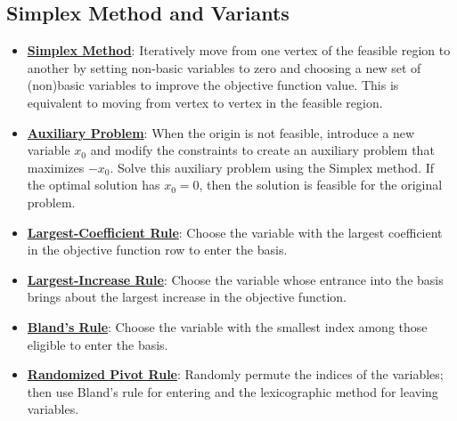 \documentclass{article}%
\begin{document}
\subsection{Simplex Method and Variants}%
\label{subsec:SimplexMethodandVariants}%
\begin{itemize}[leftmargin=*]%
\item \href{https://www.math.purdue.edu/~yipn/421/2024-08-27-ExSimplex.pdf#page=6}{\textbf{Simplex Method}}: Iteratively move from one vertex of the feasible region to another by setting non-basic variables to zero and choosing a new set of (non)basic variables to improve the objective function value. This is equivalent to moving from vertex to vertex in the feasible region.%
\item \href{https://www.math.purdue.edu/~yipn/421/2024-08-27-ExSimplex.pdf#page=32}{\textbf{Auxiliary Problem}}: When the origin is not feasible, introduce a new variable $x_0$ and modify the constraints to create an auxiliary problem that maximizes $-x_0$. Solve this auxiliary problem using the Simplex method. If the optimal solution has $x_0 = 0$, then the solution is feasible for the original problem.%
\item \href{https://www.math.purdue.edu/~yipn/421/2024-09-05-SimplexEfficiency.pdf#page=4}{\textbf{Largest-Coefficient Rule}}: Choose the variable with the largest coefficient in the objective function row to enter the basis.%
\item \href{https://www.math.purdue.edu/~yipn/421/2024-09-05-SimplexEfficiency.pdf#page=6}{\textbf{Largest-Increase Rule}}: Choose the variable whose entrance into the basis brings about the largest increase in the objective function.%
\item \href{https://www.math.purdue.edu/~yipn/421/2024-09-05-SimplexEfficiency.pdf#page=10}{\textbf{Bland's Rule}}: Choose the variable with the smallest index among those eligible to enter the basis.%
\item \href{https://www.math.purdue.edu/~yipn/421/2024-09-05-SimplexEfficiency.pdf#page=10}{\textbf{Randomized Pivot Rule}}: Randomly permute the indices of the variables; then use Bland's rule for entering and the lexicographic method for leaving variables.%

\end{itemize}
\end{document}
